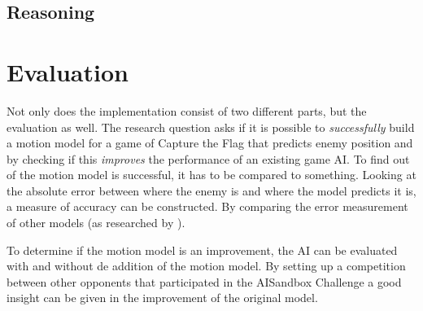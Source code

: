 \documentclass[a4paper, 12pt]{article}
\begin{document}
\subsection{Reasoning}

\section{Evaluation}
Not only does the implementation consist of two different parts, but the evaluation as well. The
research question asks if it is possible to \emph{successfully} build a motion
model for a game of Capture the Flag that predicts enemy position and by
checking if this \emph{improves} the performance of an existing game AI. To
find out of the motion model is successful, it has to be compared to something.
Looking at the absolute error between where the enemy is and where the model
predicts it is, a measure of accuracy can be constructed. By comparing the error
measurement of other models (as researched by \citep{Hladky_anevaluation}
\citep{weber2011aiide} \citep{Laird:2001:KYG:375735.376343} \citep{6374144}).

To determine if the motion model is an improvement, the AI can be evaluated with
and without de addition of the motion model. By setting up a competition between
other opponents that participated in the AISandbox Challenge a good insight can
be given in the improvement of the original model.
\end{document}
